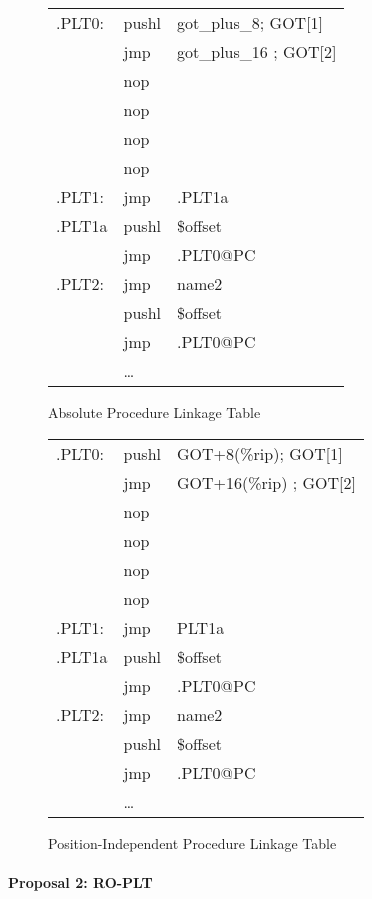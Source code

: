 \begin{figure}[H]
\caption{Absolute Procedure Linkage Table}
\begin{tabular}{lll}
.PLT0: & pushl & got\_plus\_8; GOT[1]\\
& jmp &got\_plus\_16 ; GOT[2] \\
& nop & \\
& nop & \\
& nop & \\
& nop & \\
.PLT1: & jmp & .PLT1a \\
.PLT1a& pushl & \$offset \\
&jmp &.PLT0@PC \\
.PLT2: & jmp& name2\\
&pushl & \$offset \\
& jmp & .PLT0@PC \\
&\dots\\
\end{tabular}
\end{figure}


\begin{figure}[H]
\caption{Position-Independent Procedure Linkage Table}
\begin{tabular}{lll}
.PLT0: & pushl & GOT+8(\%rip); GOT[1]\\
& jmp &GOT+16(\%rip) ; GOT[2] \\
& nop & \\
& nop & \\
& nop & \\
& nop & \\
.PLT1: & jmp & PLT1a\\
.PLT1a& pushl & \$offset \\
&jmp &.PLT0@PC \\
.PLT2: & jmp& name2\\
&pushl & \$offset \\
& jmp & .PLT0@PC \\
&\dots\\
\end{tabular}
\end{figure}


\paragraph{Proposal 2: RO-PLT}


